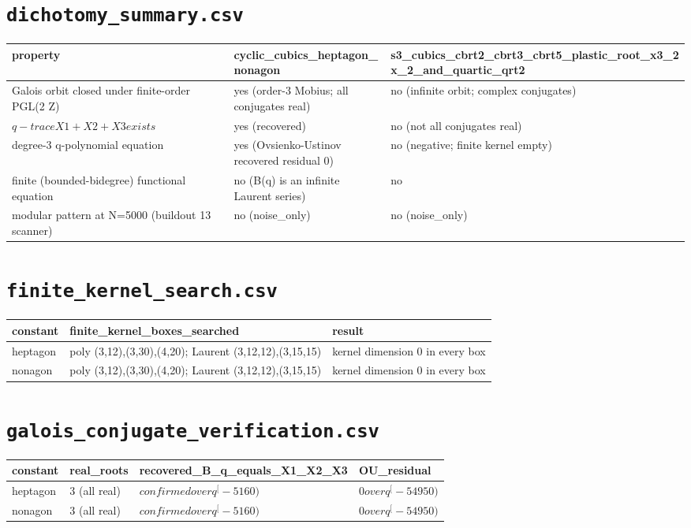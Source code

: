 \documentclass[10pt]{article}
\begin{document}
\section*{\texttt{dichotomy\_summary.csv}}
{\footnotesize
\begin{longtable}{@{}lll@{}}
\toprule
\textbf{property} & \textbf{cyclic\_cubics\_heptagon\_nonagon} & \textbf{s3\_cubics\_cbrt2\_cbrt3\_cbrt5\_plastic\_root\_x3\_2x\_2\_and\_quartic\_qrt2} \\
\midrule\endhead
Galois orbit closed under finite-order PGL(2 Z) & yes (order-3 Mobius; all conjugates real) & no (infinite orbit; complex conjugates) \\
$q-trace X1+X2+X3 exists$ & yes (recovered) & no (not all conjugates real) \\
degree-3 q-polynomial equation & yes (Ovsienko-Ustinov recovered residual 0) & no (negative; finite kernel empty) \\
finite (bounded-bidegree) functional equation & no (B(q) is an infinite Laurent series) & no \\
modular pattern at N=5000 (buildout 13 scanner) & no (noise\_only) & no (noise\_only) \\
\bottomrule
\end{longtable}}


\section*{\texttt{finite\_kernel\_search.csv}}
{\footnotesize
\begin{longtable}{@{}lll@{}}
\toprule
\textbf{constant} & \textbf{finite\_kernel\_boxes\_searched} & \textbf{result} \\
\midrule\endhead
heptagon & poly (3,12),(3,30),(4,20); Laurent (3,12,12),(3,15,15) & kernel dimension 0 in every box \\
nonagon & poly (3,12),(3,30),(4,20); Laurent (3,12,12),(3,15,15) & kernel dimension 0 in every box \\
\bottomrule
\end{longtable}}


\section*{\texttt{galois\_conjugate\_verification.csv}}
{\footnotesize
\begin{longtable}{@{}llll@{}}
\toprule
\textbf{constant} & \textbf{real\_roots} & \textbf{recovered\_B\_q\_equals\_X1\_X2\_X3} & \textbf{OU\_residual} \\
\midrule\endhead
heptagon & 3 (all real) & $confirmed over q^[-5 160)$ & $0 over q^[-5 4950)$ \\
nonagon & 3 (all real) & $confirmed over q^[-5 160)$ & $0 over q^[-5 4950)$ \\
\bottomrule
\end{longtable}}
\end{document}
